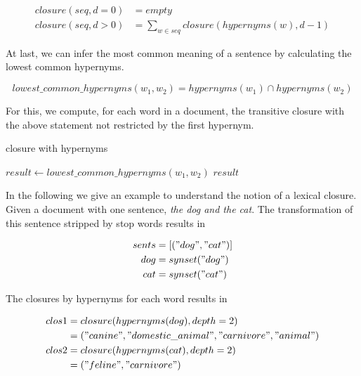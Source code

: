     \begin{equation}
    \begin{split}
      closure(seq, d=0) &= empty \\
      closure(seq, d>0) &= \sum_{w \in seq} closure(hypernyms(w), d-1)
    \end{split}
    \end{equation}

  At last, we can infer the most common meaning of a sentence by calculating the lowest common hypernyms. 

    \begin{equation}
      lowest\_common\_hypernyms(w_1, w_2) = hypernyms(w_1) \cap hypernyms(w_2)
    \end{equation}

  For this, we compute, for each word in a document, the transitive closure with the above statement not restricted by the first hypernym.

    \begin{algorithm}[H]
    \begin{algorithmic}[1]
      \caption{\wordnet{} closure with hypernyms}\label{wordnet}
          \State $result \gets lowest\_common\_hypernyms(w_1, w_2)$
        \EndFor
      \EndFor
      \State \Return $result$
    \end{algorithmic}
    \end{algorithm}

  In the following we give an example to understand the notion of a lexical closure. Given a document with one sentence, \emph{the dog and the cat}. The transformation of this sentence stripped by stop words results in

    \begin{equation}
    \begin{split}
      sents &= [("dog", "cat")] \\
      dog &= synset("dog") \\
      cat &= synset("cat")
    \end{split}
    \end{equation}

  The closures by hypernyms for each word results in

    \begin{equation}
    \begin{split}
      clos1 &= closure(hypernyms(dog), depth=2)\\
            &= ("canine", "domestic\_animal", "carnivore", "animal")\\
      clos2 &= closure(hypernyms(cat), depth=2)\\
            &= ("feline", "carnivore")
    \end{split}
    \end{equation}

